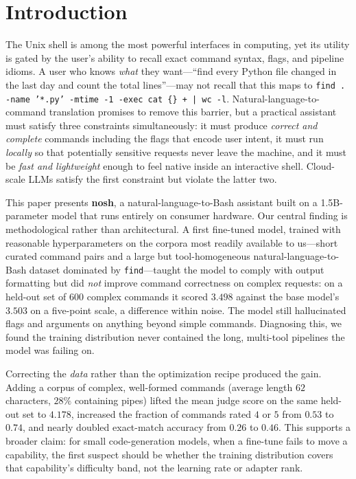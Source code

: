 \documentclass[conference]{IEEEtran}
\begin{document}
\section{Introduction}

The Unix shell is among the most powerful interfaces in computing, yet its
utility is gated by the user's ability to recall exact command syntax, flags,
and pipeline idioms. A user who knows \emph{what} they want---``find every
Python file changed in the last day and count the total lines''---may not recall
that this maps to
\texttt{find . -name '*.py' -mtime -1 -exec cat \{\} + | wc -l}.
Natural-language-to-command translation promises to remove this barrier, but a
practical assistant must satisfy three constraints simultaneously: it must
produce \emph{correct and complete} commands including the flags that encode
user intent, it must run \emph{locally} so that potentially sensitive requests
never leave the machine, and it must be \emph{fast and lightweight} enough to
feel native inside an interactive shell. Cloud-scale LLMs satisfy the first
constraint but violate the latter two.

This paper presents \textbf{nosh}, a natural-language-to-Bash assistant built on
a 1.5B-parameter model that runs entirely on consumer hardware. Our central
finding is methodological rather than architectural. A first fine-tuned model,
trained with reasonable hyperparameters on the corpora most readily available to
us---short curated command pairs and a large but tool-homogeneous
natural-language-to-Bash dataset dominated by \texttt{find}---taught the model to
comply with output formatting but did \emph{not} improve command correctness on
complex requests: on a held-out set of $600$ complex commands it scored $3.498$
against the base model's $3.503$ on a five-point scale, a difference within
noise. The model still hallucinated flags and arguments on anything beyond
simple commands. Diagnosing this, we found the training distribution never
contained the long, multi-tool pipelines the model was failing on.

Correcting the \emph{data} rather than the optimization recipe produced the
gain. Adding a corpus of complex, well-formed commands (average length $62$
characters, $28\%$ containing pipes) lifted the mean judge score on the same
held-out set to $4.178$, increased the fraction of commands rated $4$ or $5$
from $0.53$ to $0.74$, and nearly doubled exact-match accuracy from $0.26$ to
$0.46$. This supports a broader claim: for small code-generation models, when a
fine-tune fails to move a capability, the first suspect should be whether the
training distribution covers that capability's difficulty band, not the learning
rate or adapter rank.
\end{document}

